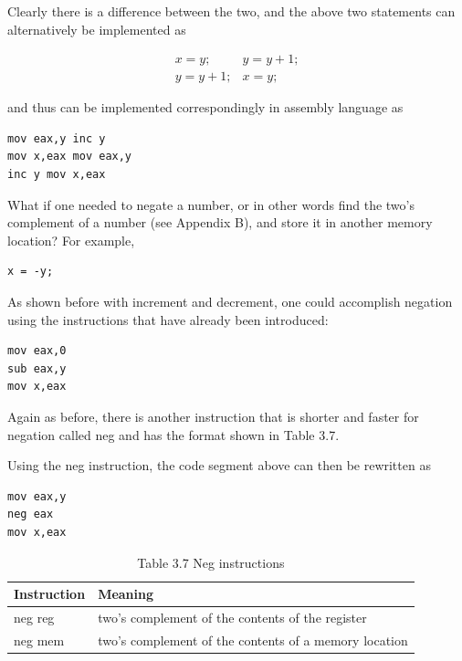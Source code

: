 \documentclass[10pt]{article}
\begin{document}
Clearly there is a difference between the two, and the above two statements can alternatively be implemented as

$$
\begin{array}{ll}
x=y ; & y=y+1 ; \\
y=y+1 ; & x=y ;
\end{array}
$$

and thus can be implemented correspondingly in assembly language as

\begin{verbatim}
mov eax,y inc y
mov x,eax mov eax,y
inc y mov x,eax
\end{verbatim}

What if one needed to negate a number, or in other words find the two's complement of a number (see Appendix B), and store it in another memory location? For example,

\begin{verbatim}
x = -y;
\end{verbatim}

As shown before with increment and decrement, one could accomplish negation using the instructions that have already been introduced:

\begin{verbatim}
mov eax,0
sub eax,y
mov x,eax
\end{verbatim}

Again as before, there is another instruction that is shorter and faster for negation called neg and has the format shown in Table 3.7.

Using the neg instruction, the code segment above can then be rewritten as

\begin{verbatim}
mov eax,y
neg eax
mov x,eax
\end{verbatim}

\begin{table}[h]
\begin{center}
\captionsetup{labelformat=empty}
\caption{Table 3.7 Neg instructions}
\begin{tabular}{|l|l|}
\hline
Instruction & Meaning \\
\hline
neg reg & two's complement of the contents of the register \\
\hline
neg mem & two's complement of the contents of a memory location \\
\hline
\end{tabular}
\end{center}
\end{table}
\end{document}
